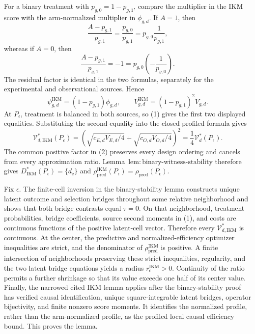 For a binary treatment with \(p_{g,0}=1-p_{g,1}\), compare the multiplier in the IKM score with the arm-normalized multiplier in \(\phi_{g,d}\). If \(A=1\), then
\[
 \frac{A-p_{g,1}}{p_{g,1}}
 =\frac{p_{g,0}}{p_{g,1}}
 =p_{g,0}\frac1{p_{g,1}},
\]
whereas if \(A=0\), then
\[
 \frac{A-p_{g,1}}{p_{g,1}}
 =-1
 =p_{g,0}\left(-\frac1{p_{g,0}}\right).
\]
The residual factor is identical in the two formulas, separately for the experimental and observational sources. Hence
\[
 \psi_{g,d}^{\mathrm{IKM}}=(1-p_{g,1})\phi_{g,d},
 \qquad
 V_{g,d}^{\mathrm{IKM}}=(1-p_{g,1})^2V_{g,d}. \tag{1}
\]
At \(P_\epsilon\), treatment is balanced in both sources, so (1) gives the first two displayed equalities. Substituting the second equality into the closed profiled formula gives
\[
 \mathcal V_{d,\mathrm{IKM}}^*(P_\epsilon)
 =\left(\sqrt{c_{E,d}V_{E,d}/4}
 +\sqrt{c_{O,d}V_{O,d}/4}\right)^2
 =\frac14\mathcal V_d^*(P_\epsilon). \tag{2}
\]
The common positive factor in (2) preserves every design ordering and cancels from every approximation ratio. Lemma~\(\mathrm{lem{:}binary\text{-}witness\text{-}stability}\) therefore gives \(D_{\mathrm{IKM}}^*(P_\epsilon)=\{d_{\mathrm e}\}\) and \(\rho_{\mathrm{pred}}^{\mathrm{IKM}}(P_\epsilon)=\rho_{\mathrm{pred}}(P_\epsilon)\).

Fix \(\epsilon\). The finite-cell inversion in the binary-stability lemma constructs unique latent outcome and selection bridges throughout some relative neighborhood and shows that both bridge contrasts equal \(\tau=0\). On that neighborhood, treatment probabilities, bridge coefficients, source second moments in (1), and costs are continuous functions of the positive latent-cell vector. Therefore every \(\mathcal V_{d,\mathrm{IKM}}^*\) is continuous. At the center, the predictive and normalized-efficiency optimizer inequalities are strict, and the denominator of \(\rho_{\mathrm{pred}}^{\mathrm{IKM}}\) is positive. A finite intersection of neighborhoods preserving these strict inequalities, regularity, and the two latent bridge equations yields a radius \(r_\epsilon^{\mathrm{IKM}}>0\). Continuity of the ratio permits a further shrinkage so that its value exceeds one half of its center value. Finally, the narrowed cited IKM lemma applies after the binary-stability proof has verified causal identification, unique square-integrable latent bridges, operator bijectivity, and finite nonzero score moments. It identifies the normalized profile, rather than the arm-normalized profile, as the profiled local causal efficiency bound. This proves the lemma.